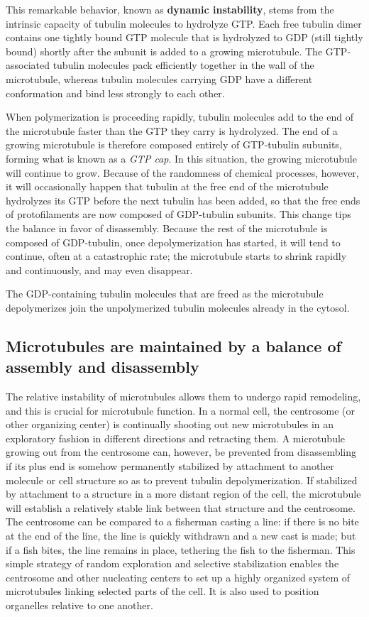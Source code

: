 This remarkable behavior, known as \textbf{dynamic instability}, stems from the
intrinsic capacity of tubulin molecules to hydrolyze GTP. Each free tubulin
dimer contains one tightly bound GTP molecule that is hydrolyzed to GDP
(still tightly bound) shortly after the subunit is added to a growing microtubule.
The GTP-associated tubulin molecules pack efficiently together
in the wall of the microtubule, whereas tubulin molecules carrying GDP
have a different conformation and bind less strongly to each other.

When polymerization is proceeding rapidly, tubulin molecules add to the
end of the microtubule faster than the GTP they carry is hydrolyzed. The
end of a growing microtubule is therefore composed entirely of GTP-tubulin
subunits, forming what is known as a \textit{GTP cap}. In this situation,
the growing microtubule will continue to grow. Because
of the randomness of chemical processes, however, it will occasionally
happen that tubulin at the free end of the microtubule hydrolyzes its GTP
before the next tubulin has been added, so that the free ends of protofilaments
are now composed of GDP-tubulin subunits. This change tips
the balance in favor of disassembly. Because the rest of
the microtubule is composed of GDP-tubulin, once depolymerization has
started, it will tend to continue, often at a catastrophic rate; the microtubule
starts to shrink rapidly and continuously, and may even disappear.

The GDP-containing tubulin molecules that are freed as the microtubule
depolymerizes join the unpolymerized tubulin molecules already in the
cytosol.

\subsection{Microtubules are maintained by a balance of assembly and disassembly}

The relative instability of microtubules allows them to undergo rapid
remodeling, and this is crucial for microtubule function. In a normal cell,
the centrosome (or other organizing center) is continually shooting out
new microtubules in an exploratory fashion in different directions and
retracting them. A microtubule growing out from the centrosome can,
however, be prevented from disassembling if its plus end is somehow
permanently stabilized by attachment to another molecule or cell structure
so as to prevent tubulin depolymerization. If stabilized by attachment
to a structure in a more distant region of the cell, the microtubule will
establish a relatively stable link between that structure and the centrosome.
The centrosome can be compared to a fisherman
casting a line: if there is no bite at the end of the line, the line is quickly
withdrawn and a new cast is made; but if a fish bites, the line remains in
place, tethering the fish to the fisherman. This simple strategy of random
exploration and selective stabilization enables the centrosome and other
nucleating centers to set up a highly organized system of microtubules
linking selected parts of the cell. It is also used to position organelles
relative to one another.

